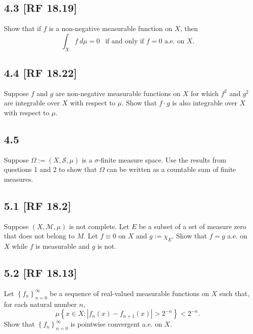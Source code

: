\documentclass[12pt]{article}
\begin{document}
\subsection*{4.3 [RF 18.19]}
\begin{tcolorbox}
Show that if $f$ is a non-negative measurable function on $X$, then 
\[ \int_{X} f\ d\mu = 0 \ \ \text{ if and only if $f = 0$ a.e. on $X$.} \]
\end{tcolorbox}

\subsection*{4.4 [RF 18.22]}
\begin{tcolorbox}
Suppose $f$ and $g$ are non-negative measurable functions on $X$ for which $f^{2}$ and $g^{2}$ are integrable over $X$ with respect to $\mu$. Show
that $f\cdot g$ is also integrable over $X$ with respect to $\mu$.
\end{tcolorbox}



\subsection*{4.5}
\begin{tcolorbox}
Suppose $\Omega := (X, \mathcal{S}, \mu)$ is a $\sigma$-finite measure space. Use the results from questions 1 and 2 to show that $\Omega$ can be written as a
countable sum of finite measures.
\end{tcolorbox}




\subsection*{5.1 [RF 18.2]}
\begin{tcolorbox}
Suppose $(X,\mathcal{M}, \mu)$ is not complete. Let $E$ be a subset of a set of measure zero that does not belong to $M$. Let $f \equiv 0$ on $X$ and $g :=
\chi_{E}$. Show that $f = g$ a.e. on $X$ while $f$ is measurable and $g$ is not.
\end{tcolorbox}


\subsection*{5.2 [RF 18.13]}
\begin{tcolorbox}
Let $\left\{ f_n \right\}_{n=0}^{\infty}$ be a sequence of real-valued measurable functions on $X$ such that, for each natural number $n$, 
\[ \mu\left\{ x \in X : |f_{n}(x) - f_{n+1}(x)| > 2^{-n} \right\} < 2^{-n}. \]
Show that $\left\{ f_{n} \right\}_{n=0}^{\infty}$ is pointwise convergent a.e. on $X$.
\end{tcolorbox}
\end{document}
